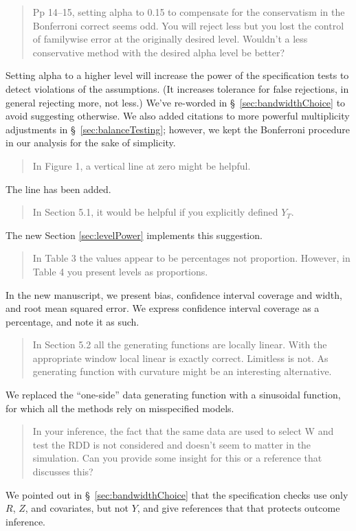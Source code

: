 \documentclass[12pt]{article}
\begin{document}
\begin{quote}
Pp 14--15, setting alpha to 0.15 to compensate for the conservatism in
the Bonferroni correct seems odd. You will reject less but you lost
the control of familywise error at the originally desired
level. Wouldn't a less conservative method with the desired alpha
level be better?
\end{quote}
Setting alpha to a higher level will increase the power of the
specification tests to detect violations of the assumptions. (It
increases tolerance for false rejections, in general rejecting more, not less.) We've
re-worded in \S~\ref{sec:bandwidthChoice} to avoid suggesting otherwise.
We also added citations to more powerful multiplicity adjustments in
\S~\ref{sec:balanceTesting}; however, we kept the Bonferroni procedure
in our analysis for the sake of simplicity.

\begin{quote}
In Figure 1, a vertical line at zero might be helpful.
\end{quote}
The line has been added.

\begin{quote}
In Section 5.1, it would be helpful if you explicitly defined $Y_T$.
\end{quote}
The new Section \ref{sec:levelPower} implements this suggestion.

\begin{quote}
In Table 3 the values appear to be percentages not proportion. However,
in Table 4 you present levels as proportions.
\end{quote}
In the new manuscript, we present bias, confidence interval coverage
and width, and root mean squared error. We express confidence interval
coverage as a percentage, and note it as such.

\begin{quote}
In Section 5.2 all the
generating functions are locally linear. With the appropriate window
local linear is exactly correct. Limitless is not. As generating
function with curvature might be an interesting alternative.
\end{quote}
We replaced the ``one-side'' data generating function with a
sinusoidal function, for which all the methods rely on misspecified
models.

\begin{quote}
In your inference, the fact that the same data are used to select W
and test the RDD is not considered and doesn't seem to matter in the
simulation. Can you provide some insight for this or a reference that
discusses this?
\end{quote}
We pointed out in \S~\ref{sec:bandwidthChoice} that the specification
checks use only $R$, $Z$, and covariates, but not $Y$, and give
references that that protects outcome inference.
\end{document}
